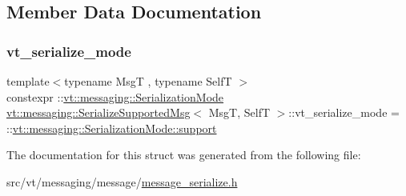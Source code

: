 \subsection{Member Data Documentation}
\mbox{\label{structvt_1_1messaging_1_1_serialize_supported_msg_a4bc4c6e7b2b6201ce8fc47babc34d799}} 
\subsubsection{\texorpdfstring{vt\+\_\+serialize\+\_\+mode}{vt\_serialize\_mode}}
{\footnotesize\ttfamily template$<$typename MsgT , typename SelfT $>$ \\
constexpr \+::\hyperlink{namespacevt_1_1messaging_a436c5b9fc7f591e5978a136999cb9ef8}{vt\+::messaging\+::\+Serialization\+Mode} \hyperlink{structvt_1_1messaging_1_1_serialize_supported_msg}{vt\+::messaging\+::\+Serialize\+Supported\+Msg}$<$ MsgT, SelfT $>$\+::vt\+\_\+serialize\+\_\+mode = \+::\hyperlink{namespacevt_1_1messaging_a436c5b9fc7f591e5978a136999cb9ef8a434990c8a25d2be94863561ae98bd682}{vt\+::messaging\+::\+Serialization\+Mode\+::support}\hspace{0.3cm}{\ttfamily [static]}}



The documentation for this struct was generated from the following file\+:\begin{DoxyCompactItemize}
\item 
src/vt/messaging/message/\hyperlink{message__serialize_8h}{message\+\_\+serialize.\+h}\end{DoxyCompactItemize}

